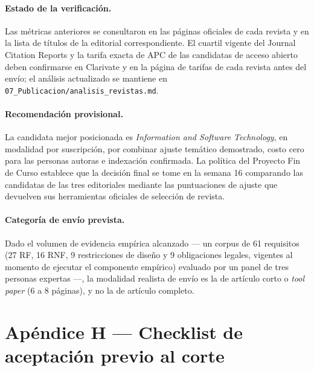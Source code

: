 \documentclass[journal,onecolumn]{IEEEtran}
\begin{document}
	\paragraph{Estado de la verificación.}
	Las métricas anteriores se consultaron en las páginas oficiales de cada
	revista y en la lista de títulos de la editorial correspondiente. El cuartil
	vigente del Journal Citation Reports y la tarifa exacta de APC de las
	candidatas de acceso abierto deben confirmarse en Clarivate y en la página de
	tarifas de cada revista antes del envío; el análisis actualizado se mantiene
	en \texttt{07\_Publicacion/analisis\_revistas.md}.
	
	\paragraph{Recomendación provisional.}
	La candidata mejor posicionada es \emph{Information and Software Technology},
	en modalidad por suscripción, por combinar ajuste temático demostrado, costo
	cero para las personas autoras e indexación confirmada. La política del
	Proyecto Fin de Curso establece que la decisión final se tome en la semana 16
	comparando las candidatas de las tres editoriales mediante las puntuaciones
	de ajuste que devuelven sus herramientas oficiales de selección de revista.
	
	\paragraph{Categoría de envío prevista.}
	Dado el volumen de evidencia empírica alcanzado --- un corpus de 61
	requisitos (27 RF, 16 RNF, 9 restricciones de diseño y 9 obligaciones
	legales, vigentes al momento de ejecutar el componente empírico)
	evaluado por un panel de tres personas expertas ---, la modalidad
	realista de envío es la de artículo corto o \emph{tool paper}
	(6 a 8 páginas), y no la de artículo completo.
	
	\section*{Apéndice H --- Checklist de aceptación previo al corte}
	\label{ap:checklist}
	
\end{document}
